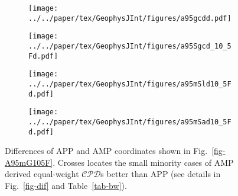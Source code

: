 \begin{figure}
  \captionsetup[subfigure]{singlelinecheck=off,justification=raggedright,aboveskip=-6pt,belowskip=-6pt}
  \centering
  \begin{subfigure}[htbp]{.49\textwidth}
    \caption{}\texttt{[image: ../../paper/tex/GeophysJInt/figures/a95gcdd.pdf]}\label{fig-A95GCD105Fd}
  \end{subfigure}
  \begin{subfigure}[htbp]{.49\textwidth}
    \caption{}\texttt{[image: ../../paper/tex/GeophysJInt/figures/a95Sgcd\_10\_5Fd.pdf]}\label{fig-A95SGCD105Fd}
  \end{subfigure}
  \begin{subfigure}[htbp]{.49\textwidth}
    \caption{}\texttt{[image: ../../paper/tex/GeophysJInt/figures/a95mSld10\_5Fd.pdf]}\label{fig-A95mSld105Fd}
  \end{subfigure}
  \begin{subfigure}[htbp]{.49\textwidth}
    \caption{}\texttt{[image: ../../paper/tex/GeophysJInt/figures/a95mSad10\_5Fd.pdf]}\label{fig-A95mSad105Fd}
  \end{subfigure}
  \caption[APP spatially better than AMP (dot)]{Differences of APP and AMP
    coordinates shown in Fig.~\ref{fig-A95mG105F}. Crosses locates the small
    minority cases of AMP derived equal-weight $\mathcal{CPD}$s better than APP
    (see details in Fig.~\ref{fig-dif} and
    Table~\ref{tab-bw}).}\label{fig-A95mG105Fd}
\end{figure}


